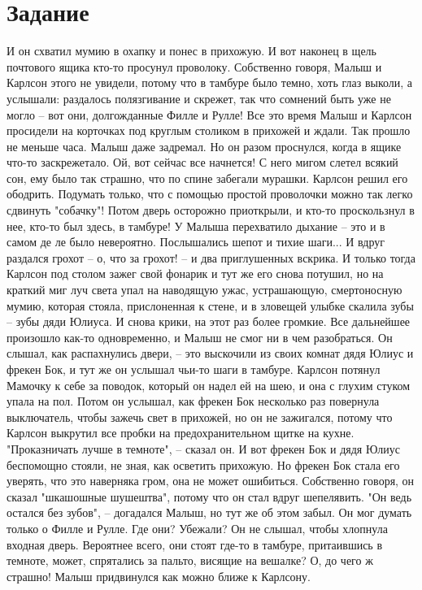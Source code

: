 \documentclass[12pt]{article}
\begin{document}
    \section{Задание}
    И он схватил мумию в охапку и понес в прихожую.
    И вот наконец в щель почтового ящика кто-то просунул проволоку.
    Собственно говоря, Малыш и Карлсон этого не увидели, потому что
    в тамбуре было темно, хоть глаз выколи, а услышали: раздалось полязгивание
    и скрежет, так что сомнений быть уже не могло -- вот они, долгожданные Филле и
    Рулле! Все это время Малыш и Карлсон просидели на корточках под
    круглым столиком     в прихожей и ждали. Так прошло не меньше
    часа. Малыш даже задремал. Но он разом проснулся, когда в ящике
    что-то заскрежетало. Ой, вот сейчас все начнется!
    С него мигом слетел всякий сон, ему было так страшно,
    что по спине забегали мурашки. Карлсон решил его ободрить.
    Подумать только, что с помощью простой проволочки можно
    так легко сдвинуть "собачку"! Потом дверь осторожно приоткрыли,
    и кто-то проскользнул в нее, кто-то был здесь, в тамбуре!
    У Малыша перехватило дыхание -- это и в самом де ле было невероятно.
    Послышались шепот и тихие шаги... И вдруг раздался грохот -- о,
    что за грохот! -- и два приглушенных вскрика. И только тогда
    Карлсон под столом зажег свой фонарик и тут же его снова потушил,
    но на краткий миг луч света упал на наводящую ужас, устрашающую,
    смертоносную мумию, которая стояла, прислоненная к стене, и в зловещей
    улыбке скалила зубы -- зубы дяди Юлиуса. И снова крики, на этот
    раз более громкие. Все дальнейшее произошло как-то одновременно,
    и Малыш не смог ни в чем разобраться. Он слышал, как распахнулись
    двери, -- это выскочили из своих комнат дядя Юлиус и фрекен Бок,
    и тут же он услышал чьи-то шаги в тамбуре. Карлсон потянул Мамочку
    к себе за поводок, который он надел ей на шею, и она с глухим стуком
    упала на пол. Потом он услышал, как фрекен Бок несколько раз повернула
    выключатель, чтобы зажечь свет в прихожей, но он не зажигался,
    потому что Карлсон выкрутил все пробки на предохранительном щитке
    на кухне. "Проказничать лучше в темноте", -- сказал он. И вот фрекен
    Бок и дядя Юлиус беспомощно стояли, не зная, как осветить прихожую.
    Но фрекен Бок стала его уверять, что это наверняка гром, она не может
    ошибиться. Собственно говоря, он сказал "шкашошные шушештва", потому
    что он стал вдруг шепелявить. "Он ведь остался без зубов", -- догадался
    Малыш, но тут же об этом забыл. Он мог думать только о Филле и
    Рулле. Где они? Убежали? Он не слышал, чтобы хлопнула входная дверь.
    Вероятнее всего, они стоят где-то в тамбуре, притаившись в темноте,
    может, спрятались за пальто, висящие на вешалке? О, до чего ж страшно!
    Малыш придвинулся как можно ближе к Карлсону.
    \newpage
\end{document}
